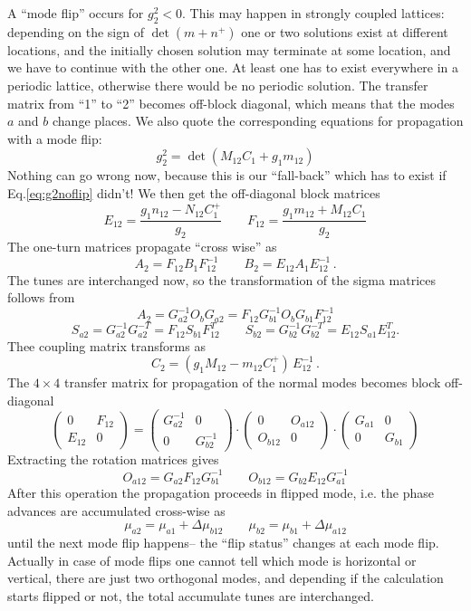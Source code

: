 \documentclass[12pt]{article}
\newcommand\beq{\begin{equation}}
\newcommand\eeq{\end{equation}}
\begin{document}
A ``mode flip'' occurs for $g^2_2<0$. This may happen in strongly coupled lattices: depending on the sign of $\det(m+n^+)$ one or two solutions exist at different locations, and the initially chosen solution may terminate at some location, and we have to continue with the other one. At least one has to exist everywhere in a periodic lattice, otherwise there would be no periodic solution. The transfer matrix from ``1'' to ``2'' becomes off-block diagonal, which means that the modes $a$ and $b$ change places.
We also quote the corresponding equations for propagation with a mode flip:
\beq
g_2^2=\det (M_{12} C_1+g_1 m_{12})
\eeq
Nothing can go wrong now, because this is our ``fall-back'' which has to exist if Eq.\ref{eq:g2noflip} didn't! We then get the off-diagonal block matrices
\beq
E_{12}=\frac{g_1n_{12}-N_{12}C_1^+}{g_2}\qquad
F_{12}=\frac{g_1m_{12}+M_{12}C_1}{g_2}
\eeq
The one-turn matrices propagate ``cross wise'' as
\beq
A_2=F_{12}B_1 F_{12}^{-1}\qquad  B_2=E_{12}A_1 E_{12}^{-1}\, .
\eeq
The tunes are interchanged now, so the transformation of the sigma matrices follows from
\beq
A_2 = {G}_{a2}^{-1} {O}_b {G}_{a2} = F_{12} {G}_{b1}^{-1} {O}_b {G}_{b1} F_{12}^{-1}
\eeq
\beq
S_{a2} =  {G}_{a2}^{-1} {G}_{a2}^{-T} = F_{12} S_{b1} F_{12}^T\qquad
S_{b2} =  {G}_{b2}^{-1} {G}_{b2}^{-T} = E_{12} S_{a1} E_{12}^T.
\eeq
Thee coupling matrix transforms as
\beq
C_2=(g_1 M_{12} -  m_{12}C_1^+)\,E_{12}^{-1}\, .
\eeq
The $4\times 4$ transfer matrix for propagation of the normal modes becomes block off-diagonal
\beq
\left(
\begin{array}{cc}
0 & F_{12} \\ E_{12} & 0
\end{array}
\right)
=
\left(
\begin{array}{cc}
G_{a2}^{-1} & 0 \\ 0 & G_{b2}^{-1}
\end{array}
\right)
\cdot
\left(
\begin{array}{cc}
0 & O_{a12} \\ O_{b12} & 0
\end{array}\right)
\cdot
\left(
\begin{array}{cc}
G_{a1} & 0 \\ 0 & G_{b1}
\end{array}
\right)
\eeq
Extracting the rotation matrices gives
\beq
O_{a12}=G_{a2}F_{12}G_{b1}^{-1} \qquad O_{b12}=G_{b2}E_{12}G_{a1}^{-1}
\eeq
After this operation the propagation proceeds in flipped mode, i.e. the phase advances are accumulated cross-wise as
\beq\label{eq:fliptunes}
\mu_{a2}=\mu_{a1}+\Delta\mu_{b12} \qquad \mu_{b2}=\mu_{b1}+\Delta\mu_{a12}
\eeq
until the next mode flip happens-- the ``flip status'' changes at each mode flip.  Actually in case of mode flips one cannot tell which mode is horizontal or vertical, there are just two orthogonal modes, and depending if the calculation starts flipped or not, the total accumulate tunes are interchanged.
\end{document}
